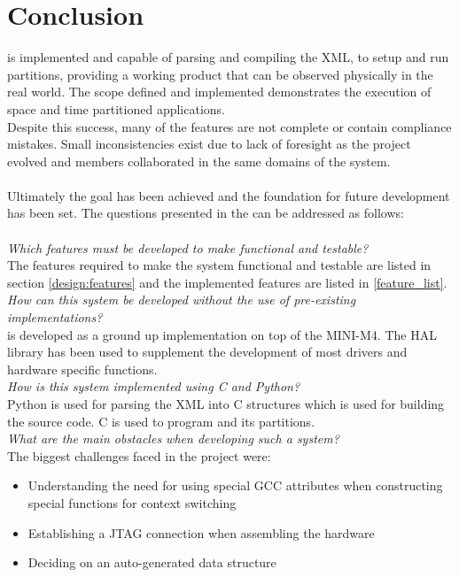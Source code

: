 \chapter{Conclusion}
\OSname{} is implemented and capable of parsing and 
compiling the XML, to setup and run partitions, providing 
a working product that can be observed physically in the real world.
The scope defined and implemented demonstrates the 
execution of space and time partitioned applications.
\\
Despite this success, many of the features are not 
complete or contain compliance mistakes. 
Small inconsistencies exist due to lack of foresight
as the project evolved and members collaborated 
in the same domains of the system.
\\\\
Ultimately the goal has been achieved and the 
foundation for future development has been set.
The questions presented in the  can be addressed as follows:
\\\\
\textit{Which features must be developed to make \OSname{} functional and
testable?}\\
The features required to make the system functional and testable are listed in  section \ref{design:features}
and the implemented features are listed in \ref{feature_list}.\\

\textit{How can this system be developed without the use of pre-existing
implementations?}\\
\OSname{} is developed as a ground up implementation on top of the MINI-M4.
The HAL library has been used to supplement the development of most drivers and hardware specific functions.\\

\textit{How is this system implemented using C and Python?}\\
Python is used for parsing the XML into C structures which is used for building the source code.
C is used to program \OSname{} and its partitions.\\

\textit{What are the main obstacles when developing such a system?}\\
The biggest challenges faced in the project were:
\begin{itemize}
	\item Understanding the need for using special GCC attributes when constructing special functions for context switching
	\item Establishing a JTAG connection when assembling the hardware
	\item Deciding on an auto-generated data structure
\end{itemize}

